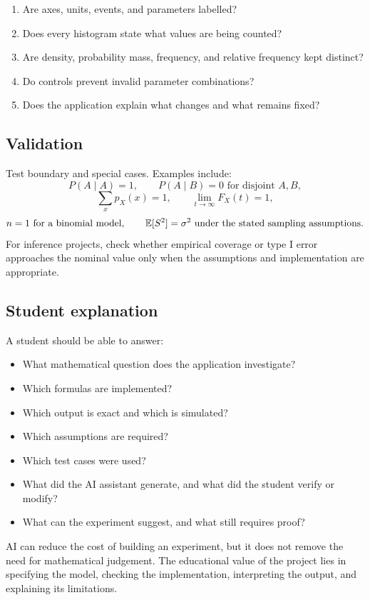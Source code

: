 \begin{enumerate}
    \item Are axes, units, events, and parameters labelled?
    \item Does every histogram state what values are being counted?
    \item Are density, probability mass, frequency, and relative frequency kept distinct?
    \item Do controls prevent invalid parameter combinations?
    \item Does the application explain what changes and what remains fixed?
\end{enumerate}

\subsection*{Validation}

Test boundary and special cases. Examples include:
\[
P(A\mid A)=1,\qquad
P(A\mid B)=0\text{ for disjoint }A,B,
\]
\[
\sum_x p_X(x)=1,\qquad
\lim_{t\to\infty}F_X(t)=1,
\]
\[
n=1\text{ for a binomial model},\qquad
\mathbb{E}[S^2]=\sigma^2\text{ under the stated sampling assumptions}.
\]
For inference projects, check whether empirical coverage or type I error approaches the nominal value only when the assumptions and implementation are appropriate.

\subsection*{Student explanation}

A student should be able to answer:

\begin{itemize}
    \item What mathematical question does the application investigate?
    \item Which formulas are implemented?
    \item Which output is exact and which is simulated?
    \item Which assumptions are required?
    \item Which test cases were used?
    \item What did the AI assistant generate, and what did the student verify or modify?
    \item What can the experiment suggest, and what still requires proof?
\end{itemize}

\begin{theorembox}
AI can reduce the cost of building an experiment, but it does not remove the need for mathematical judgement. The educational value of the project lies in specifying the model, checking the implementation, interpreting the output, and explaining its limitations.
\end{theorembox}
